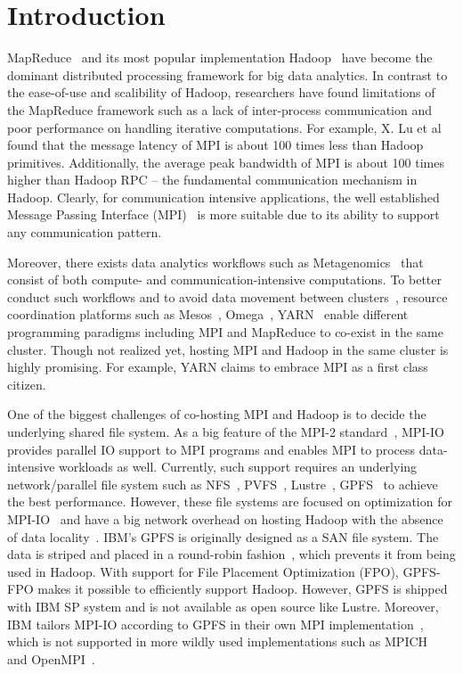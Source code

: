 \section{Introduction}
MapReduce~\cite{mr} and its most popular implementation Hadoop~\cite{hadoop}
have become the dominant distributed processing framework for big data
analytics. In contrast to the ease-of-use and scalibility of Hadoop, researchers
have found limitations of the MapReduce framework such as a lack of inter-process
communication and poor performance on handling iterative computations. For
example, X. Lu et al~\cite{xlu} found that the message latency of MPI is about
100 times less than Hadoop primitives. Additionally, the average peak bandwidth of MPI is
about 100 times higher than Hadoop RPC -- the fundamental communication
mechanism in Hadoop. Clearly, for communication intensive applications, the well established Message Passing
Interface (MPI)~\cite{mpi2012} is more suitable due to its ability to support
any communication pattern.
 
Moreover, there exists data analytics workflows such as
Metagenomics~\cite{meta} that consist of both compute- and communication-intensive
computations. To better conduct such workflows and to avoid data
movement between clusters~\cite{catch}, resource coordination platforms such as
Mesos~\cite{mesos}, Omega~\cite{omega}, YARN~\cite{yarn2013} enable different
programming paradigms including MPI and MapReduce to co-exist in the same
cluster. Though not realized yet, hosting MPI and Hadoop in the same cluster is
highly promising. For example, YARN claims to embrace MPI as a first class citizen.

One of the biggest challenges of co-hosting MPI and Hadoop is to decide the
underlying shared file system. As a big feature of the MPI-2 standard~\cite{mpi2012},
MPI-IO provides parallel IO support to MPI programs and enables MPI to process
data-intensive workloads as well. Currently, such support requires an underlying
network/parallel file system such as NFS~\cite{nfs1}, PVFS~\cite{pvfs},
Lustre~\cite{lustre}, GPFS~\cite{gpfs} to achieve the best performance. However,
these file systems are focused on optimization for MPI-IO~\cite{mpipvfs,
mpilustre1, mpigpfs} and have a big network overhead on hosting Hadoop with the
absence of data locality~\cite{hadooplustre}. IBM's GPFS is originally designed
as a SAN file system. The data is striped and placed in a round-robin
fashion~\cite{gpfs}, which prevents it from being used in Hadoop. With support
for File Placement Optimization (FPO), GPFS-FPO makes it possible to efficiently
support Hadoop.  However, GPFS is shipped with IBM SP system and is not
available as open source like Lustre. Moreover, IBM tailors MPI-IO according to
GPFS in their own MPI implementation~\cite{mpigpfs}, which is not supported in
more wildly used implementations such as MPICH~\cite{mpich} and
OpenMPI~\cite{openmpi}.

